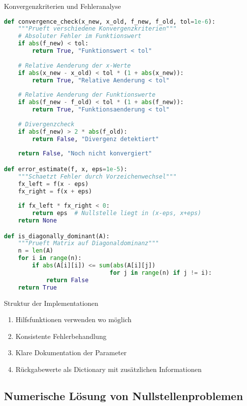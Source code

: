 \begin{examplecode}{Konvergenzkriterien und Fehleranalyse}
\begin{lstlisting}[language=Python, style=basesmol]
def convergence_check(x_new, x_old, f_new, f_old, tol=1e-6):
    """Prueft verschiedene Konvergenzkriterien"""
    # Absoluter Fehler im Funktionswert
    if abs(f_new) < tol:
        return True, "Funktionswert < tol"
        
    # Relative Aenderung der x-Werte 
    if abs(x_new - x_old) < tol * (1 + abs(x_new)):
        return True, "Relative Aenderung < tol"
        
    # Relative Aenderung der Funktionswerte
    if abs(f_new - f_old) < tol * (1 + abs(f_new)):
        return True, "Funktionsaenderung < tol"
        
    # Divergenzcheck
    if abs(f_new) > 2 * abs(f_old):
        return False, "Divergenz detektiert"
        
    return False, "Noch nicht konvergiert"

def error_estimate(f, x, eps=1e-5):
    """Schaetzt Fehler durch Vorzeichenwechsel"""
    fx_left = f(x - eps)
    fx_right = f(x + eps)
    
    if fx_left * fx_right < 0:
        return eps  # Nullstelle liegt in (x-eps, x+eps)
    return None

def is_diagonally_dominant(A):
    """Prueft Matrix auf Diagonaldominanz"""
    n = len(A)
    for i in range(n):
        if abs(A[i][i]) <= sum(abs(A[i][j]) 
                              for j in range(n) if j != i):
            return False
    return True
\end{lstlisting}
\end{examplecode}

\begin{KR}{Struktur der Implementationen}
\begin{enumerate}
    \item Hilfsfunktionen verwenden wo möglich
    \item Konsistente Fehlerbehandlung
    \item Klare Dokumentation der Parameter
    \item Rückgabewerte als Dictionary mit zusätzlichen Informationen
\end{enumerate}
\end{KR}

\subsection{Numerische Lösung von Nullstellenproblemen}

